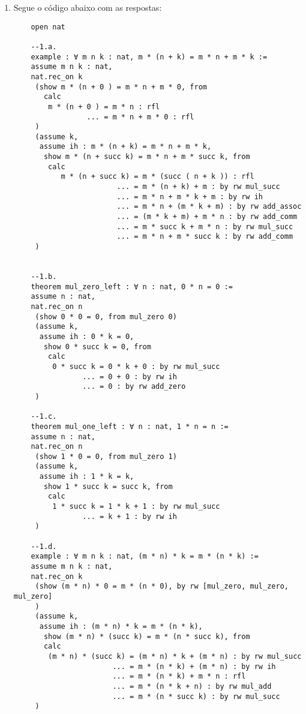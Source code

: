 \begin{enumerate}
    
    \item Segue o código abaixo com as respostas:
    
    \begin{lstlisting}
    open nat
    
    --1.a.
    example : ∀ m n k : nat, m * (n + k) = m * n + m * k := 
    assume m n k : nat,
    nat.rec_on k
     (show m * (n + 0 ) = m * n + m * 0, from
       calc 
        m * (n + 0 ) = m * n : rfl 
                 ... = m * n + m * 0 : rfl
     )
     (assume k,
      assume ih : m * (n + k) = m * n + m * k,
       show m * (n + succ k) = m * n + m * succ k, from
        calc
           m * (n + succ k) = m * (succ ( n + k )) : rfl
                        ... = m * (n + k) + m : by rw mul_succ 
                        ... = m * n + m * k + m : by rw ih
                        ... = m * n + (m * k + m) : by rw add_assoc
                        ... = (m * k + m) + m * n : by rw add_comm
                        ... = m * succ k + m * n : by rw mul_succ
                        ... = m * n + m * succ k : by rw add_comm
     )
    
    
    --1.b.
    theorem mul_zero_left : ∀ n : nat, 0 * n = 0 :=
    assume n : nat,
    nat.rec_on n
     (show 0 * 0 = 0, from mul_zero 0)
     (assume k,
      assume ih : 0 * k = 0,
       show 0 * succ k = 0, from
        calc
         0 * succ k = 0 * k + 0 : by rw mul_succ
                ... = 0 + 0 : by rw ih
                ... = 0 : by rw add_zero
     )
    
    --1.c.
    theorem mul_one_left : ∀ n : nat, 1 * n = n := 
    assume n : nat,
    nat.rec_on n
     (show 1 * 0 = 0, from mul_zero 1)
     (assume k,
      assume ih : 1 * k = k,
       show 1 * succ k = succ k, from
        calc
         1 * succ k = 1 * k + 1 : by rw mul_succ
                ... = k + 1 : by rw ih
     )
    
    --1.d.
    example : ∀ m n k : nat, (m * n) * k = m * (n * k) := 
    assume m n k : nat,
    nat.rec_on k
     (show (m * n) * 0 = m * (n * 0), by rw [mul_zero, mul_zero, mul_zero]
     )
     (assume k,
      assume ih : (m * n) * k = m * (n * k),
       show (m * n) * (succ k) = m * (n * succ k), from
       calc 
        (m * n) * (succ k) = (m * n) * k + (m * n) : by rw mul_succ
                       ... = m * (n * k) + (m * n) : by rw ih
                       ... = m * (n * k) + m * n : rfl
                       ... = m * (n * k + n) : by rw mul_add
                       ... = m * (n * succ k) : by rw mul_succ
     )
    

\end{lstlisting}
\end{enumerate}
